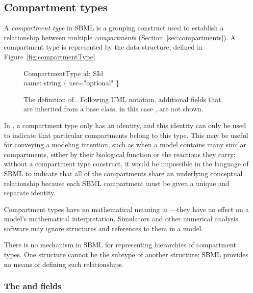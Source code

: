 \subsection{Compartment types}
\label{sec:compartmentType}

A \emph{compartment type} in SBML is a grouping construct used to
establish a relationship between multiple \emph{compartments}
(Section~\ref{sec:compartments}).  A compartment type is
represented by the \CompartmentType data structure, defined in
Figure~\vref{fig:compartmentType}.

\begin{figure}[htb]
  \centering
  \begin{classbox}{CompartmentType}
    id: SId                           \\
    name: string \{ use="optional" \} \\
  \end{classbox}
  \caption{The definition of \CompartmentType.  Following UML notation,
    additional fields
    that are inherited from a base class, in this case \SBase, are not shown.}
  \label{fig:compartmentType}
\end{figure}

In \sbmltwotwo, a compartment type only has an identity, and this
identity can only be used to indicate that particular compartments
belong to this type.  This may be useful for conveying a modeling
intention, such as when a model contains many similar
compartments, either by their biological function or the reactions
they carry; without a compartment type construct, it would be
impossible in the language of SBML to indicate that all of the
compartments share an underlying conceptual relationship because
each SBML compartment must be given a unique and separate
identity.

Compartment types have no mathematical meaning in
\sbmltwotwo---they have no effect on a model's mathematical
interpretation.  Simulators and other numerical analysis software
may ignore \CompartmentType structures and references to them in a
model.

There is no mechanism in SBML for representing hierarchies of
compartment types.  One \CompartmentType structure cannot be the
subtype of another \CompartmentType structure; SBML provides no
means of defining such relationships.


\subsubsection{The  and  fields}

